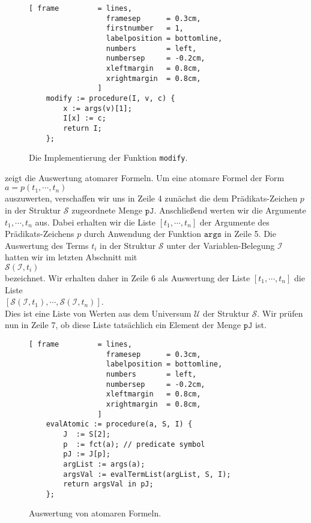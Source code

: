 \begin{figure}[!ht]
\centering
\begin{Verbatim}[ frame         = lines, 
                  framesep      = 0.3cm, 
                  firstnumber   = 1,
                  labelposition = bottomline,
                  numbers       = left,
                  numbersep     = -0.2cm,
                  xleftmargin   = 0.8cm,
                  xrightmargin  = 0.8cm,
                ]
    modify := procedure(I, v, c) {
        x := args(v)[1];
        I[x] := c;
        return I;
    };
\end{Verbatim}
\vspace*{-0.3cm}
\caption{Die Implementierung der Funktion \texttt{modify}.}
\label{fig:modify.stlx}
\end{figure}


 zeigt die Auswertung atomarer Formeln.  Um eine atomare Formel der Form
\\[0.2cm]
\hspace*{1.3cm}
$a = p(t_1, \cdots, t_n)$ 
\\[0.2cm]
auszuwerten, verschaffen wir uns in Zeile 4 zun\"{a}chst die dem Pr\"{a}dikats-Zeichen $p$ in der
Struktur $\mathcal{S}$ zugeordnete Menge $\mathtt{pJ}$.  Anschlie\ss{}end werten wir die Argumente
 $t_1, \cdots, t_n$ aus.  Dabei erhalten wir die Liste $[t_1, \cdots, t_n]$ der Argumente des
 Pr\"adikats-Zeichens $p$ durch Anwendung der Funktion $\mathtt{args}$ in Zeile 5.
Die Auswertung des Terms $t_i$ in der Struktur $\mathcal{S}$ unter der Variablen-Belegung $\mathcal{I}$  hatten
wir im letzten Abschnitt mit 
\\[0.2cm]
\hspace*{1.3cm}
$\mathcal{S}(\mathcal{I}, t_i)$
\\[0.2cm]
bezeichnet.  Wir erhalten daher in Zeile 6 als Auswertung der Liste $[t_1,\cdots,t_n]$ die Liste
\\[0.2cm]
\hspace*{1.3cm}
$[\mathcal{S}(\mathcal{I}, t_1), \cdots, \mathcal{S}(\mathcal{I}, t_n)]$.
\\[0.2cm]
Dies ist eine Liste von Werten aus dem Universum $\mathcal{U}$ der Struktur $\mathcal{S}$.  Wir pr\"ufen nun in
Zeile 7, ob diese Liste tats\"{a}chlich ein Element der Menge $\mathtt{pJ}$ ist.



\begin{figure}[!ht]
  \centering
\begin{Verbatim}[ frame         = lines, 
                  framesep      = 0.3cm, 
                  labelposition = bottomline,
                  numbers       = left,
                  numbersep     = -0.2cm,
                  xleftmargin   = 0.8cm,
                  xrightmargin  = 0.8cm,
                ]
    evalAtomic := procedure(a, S, I) {
        J  := S[2];
        p  := fct(a); // predicate symbol
        pJ := J[p];
        argList := args(a);
        argsVal := evalTermList(argList, S, I);
        return argsVal in pJ;
    };  
\end{Verbatim}
\vspace*{-0.3cm}
\caption{Auswertung von atomaren Formeln.}
\label{fig:evalAtomic.stlx}
\end{figure}

